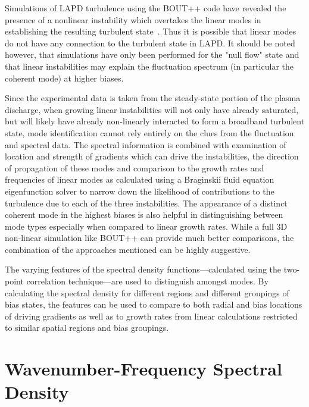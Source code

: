 \documentclass[aip,pop,amsmath,amssymb,reprint,superscriptaddress]{revtex4-1} %
\begin{document}
Simulations of LAPD turbulence using the BOUT++ code have revealed the presence of a nonlinear instability which overtakes the linear modes in establishing the resulting turbulent state~\cite{friedman12}. Thus it is possible that linear modes do not have any connection to the turbulent state in LAPD.  It should be noted however, that simulations have only been performed for the "null flow" state and that linear instabilities may explain the fluctuation spectrum (in particular the coherent mode) at higher biases.

Since the experimental data is taken from the steady-state portion of the plasma discharge, when growing linear instabilities will not only have already saturated, but will likely have already non-linearly interacted to form a broadband turbulent state, mode identification cannot rely entirely on the clues from the fluctuation and spectral data. The spectral information is combined with examination of location and strength of gradients which can drive the instabilities, the direction of propagation of these modes and comparison to the growth rates and frequencies of linear modes as calculated using a Braginskii fluid equation eigenfunction solver to narrow down the likelihood of contributions to the turbulence due to each of the three instabilities. The appearance of a distinct coherent mode in the highest biases is also helpful in distinguishing between mode types especially when compared to linear growth rates. While a full 3D non-linear simulation like BOUT++ can provide much better comparisons, the combination of the approaches mentioned can be highly suggestive.

The varying features of the spectral density functions---calculated using the two-point correlation technique---are used to distinguish amongst modes. By calculating the spectral density for different regions and different groupings of bias states, the features can be used to compare to both radial and bias locations of driving gradients as well as to growth rates from linear calculations restricted to similar spatial regions and bias groupings.

\section{Wavenumber-Frequency Spectral Density}
\end{document}
